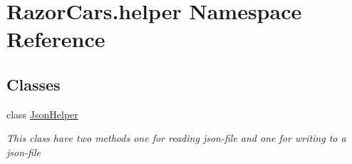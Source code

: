 \hypertarget{namespace_razor_cars_1_1helper}{}\section{Razor\+Cars.\+helper Namespace Reference}
\label{namespace_razor_cars_1_1helper}
\subsection*{Classes}
\begin{DoxyCompactItemize}
\item 
class \mbox{\hyperlink{class_razor_cars_1_1helper_1_1_json_helper}{Json\+Helper}}
\begin{DoxyCompactList}\small\item\em This class have two methods one for reading json-\/file and one for writing to a json-\/file \end{DoxyCompactList}\end{DoxyCompactItemize}
